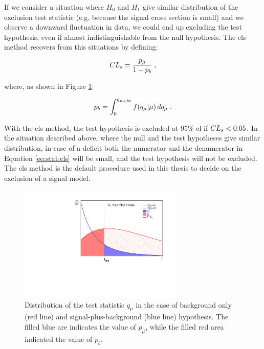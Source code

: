 If we consider a situation where $H_0$ and $H_1$ give similar distribution of the exclusion test statistic (e.g. because the signal cross section is
small) and we observe a downward fluctuation in data, we could end up excluding the test hypothesis, even if almost indistinguishable from the null hypothesis. The \gls{cls} method \cite{JUNK1999435} recovers from this situations by defining:

\begin{equation}
\label{eq:stat:cls}
CL_s = \dfrac{p_\mu}{1 - p_b} \; , 
\end{equation}

\noindent where, as shown in Figure \ref{fig:stat:pmu_pb}:

\begin{equation}
\label{eq:stat:pb}
p_b = \int_{0}^{q_{\mu,{\rm obs}}} f(q_{\mu} | \mu ) \,
d q_{\mu}  \; .
\end{equation}

With the \gls{cls} method, the test hypothesis is excluded at 95\% \gls{cl} if $CL_s < 0.05$. In the situation described above, where the null and the test hypotheses give similar \qmu distribution, in case of a deficit both the numerator and the denumerator in Equation \ref{eq:stat:cls} will be small, and the test hypothesis will not be excluded. The \gls{cls} method is the default procedure used in this thesis to decide on the exclusion of a signal model. 


\begin{figure}
\centering
\includegraphics[width=0.7\textwidth]{produce_plots/stat/pmu_pb.pdf}
\caption{Distribution of the test statistic $q_\mu$ in the case of background only (red line) and signal-plus-background (blue line) hypothesis. The filled blue are indicates the value of $p_\mu$, while the filled red area indicated the value of $p_b$.}
\label{fig:stat:pmu_pb}
\end{figure}

